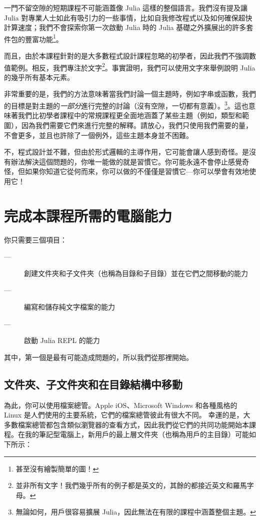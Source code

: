 \documentclass[]{article}
\begin{document}
一門不留空隙的短期課程不可能涵蓋像 Julia 這樣的整個語言。我們沒有提及讓 Julia 對專業人士如此有吸引力的一些事情，比如自我修改程式以及如何確保超快計算速度；我們不會探索你第一次啟動 Julia 時的 Julia 基礎之外擴展出的許多套件包的豐富功能\footnote{甚至沒有繪製簡單的圖！}。

而且，由於本課程針對的是大多數程式設計課程忽略的初學者，因此我們不強調數值範例。相反，我們專注於文字\footnote{並非所有文字！我們幾乎所有的例子都是英文的，其餘的都接近英文和羅馬字母。}。事實證明，我們可以使用文字來舉例說明 Julia 的幾乎所有基本元素。

非常重要的是，我們的方法意味著當我們討論一個主題時，例如字串或函數，我們的目標是對主題的\emph{一部分}進行完整的討論（沒有空隙，一切都有意義）。\footnote{無論如何，用戶很容易擴展 Julia，因此無法在有限的課程中涵蓋整個主題。}。這也意味著我們比初學者課程中的常規課程更全面地涵蓋了某些主題（例如，類型和範圍），因為我們需要它們來進行完整的解釋。請放心，我們只使用我們需要的量，不會更多，並且也許除了一個例外，這些主題本身並不困難。

不，程式設計並不難，但由於形式邏輯的主導作用，它可能會讓人感到奇怪。是沒有辦法解決這個問題的，你唯一能做的就是習慣它。你可能永遠不會停止感覺奇怪，但如果你知道它從何而來，你可以做的不僅僅是習慣它---你可以學會有效地使用它！

\section*{完成本課程所需的電腦能力}

你只需要三個項目：

\begin{description}
	\item[---] 創建文件夾和子文件夾（也稱為目錄和子目錄）並在它們之間移動的能力
	\item[---] 編寫和儲存純文字檔案的能力
	\item[---] 啟動 Julia REPL 的能力
\end{description}

其中，第一個是最有可能造成問題的，所以我們從那裡開始。

\subsection*{文件夾、子文件夾和在目錄結構中移動}

為此，你可以使用檔案總管。Apple iOS、Microsoft Windows 和各種風格的 Linux 是人們使用的主要系統，它們的檔案總管彼此有很大不同。
幸運的是，大多數檔案總管都包含類似瀏覽器的查看方式，因此我們從它們的共同功能開始本課程。在我的筆記型電腦上，新用戶的最上層文件夾（也稱為用戶的主目錄）可能如下所示：
\end{document}
